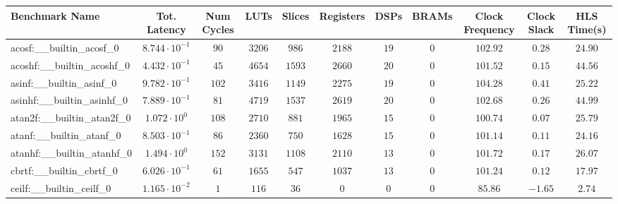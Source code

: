\begin{tabular}{|l|c|c|c|c|c|c|c|c|c|c|}
\hline
Benchmark Name                            & Tot. Latency            & Num Cycles & LUTs      & Slices    & Registers & DSPs    & BRAMs & Clock Frequency & Clock Slack & HLS Time(s) \\
\hline
acosf:\_\_builtin\_acosf\_0               & $ 8.744 \cdot 10^{-1} $ & $ 90     $ & $ 3206  $ & $ 986   $ & $ 2188  $ & $ 19  $ & $ 0 $ & $ 102.92      $ & $ 0.28    $ & $ 24.90   $ \\
acoshf:\_\_builtin\_acoshf\_0             & $ 4.432 \cdot 10^{-1} $ & $ 45     $ & $ 4654  $ & $ 1593  $ & $ 2660  $ & $ 20  $ & $ 0 $ & $ 101.52      $ & $ 0.15    $ & $ 44.56   $ \\
asinf:\_\_builtin\_asinf\_0               & $ 9.782 \cdot 10^{-1} $ & $ 102    $ & $ 3416  $ & $ 1149  $ & $ 2275  $ & $ 19  $ & $ 0 $ & $ 104.28      $ & $ 0.41    $ & $ 25.22   $ \\
asinhf:\_\_builtin\_asinhf\_0             & $ 7.889 \cdot 10^{-1} $ & $ 81     $ & $ 4719  $ & $ 1537  $ & $ 2619  $ & $ 20  $ & $ 0 $ & $ 102.68      $ & $ 0.26    $ & $ 44.99   $ \\
atan2f:\_\_builtin\_atan2f\_0             & $ 1.072 \cdot 10^{0}  $ & $ 108    $ & $ 2710  $ & $ 881   $ & $ 1965  $ & $ 15  $ & $ 0 $ & $ 100.74      $ & $ 0.07    $ & $ 25.79   $ \\
atanf:\_\_builtin\_atanf\_0               & $ 8.503 \cdot 10^{-1} $ & $ 86     $ & $ 2360  $ & $ 750   $ & $ 1628  $ & $ 15  $ & $ 0 $ & $ 101.14      $ & $ 0.11    $ & $ 24.16   $ \\
atanhf:\_\_builtin\_atanhf\_0             & $ 1.494 \cdot 10^{0}  $ & $ 152    $ & $ 3131  $ & $ 1108  $ & $ 2110  $ & $ 13  $ & $ 0 $ & $ 101.72      $ & $ 0.17    $ & $ 26.07   $ \\
cbrtf:\_\_builtin\_cbrtf\_0               & $ 6.026 \cdot 10^{-1} $ & $ 61     $ & $ 1655  $ & $ 547   $ & $ 1037  $ & $ 13  $ & $ 0 $ & $ 101.24      $ & $ 0.12    $ & $ 17.97   $ \\
ceilf:\_\_builtin\_ceilf\_0               & $ 1.165 \cdot 10^{-2} $ & $ 1      $ & $ 116   $ & $ 36    $ & $ 0     $ & $ 0   $ & $ 0 $ & $ 85.86       $ & $ -1.65   $ & $ 2.74    $ \\

\end{tabular}
